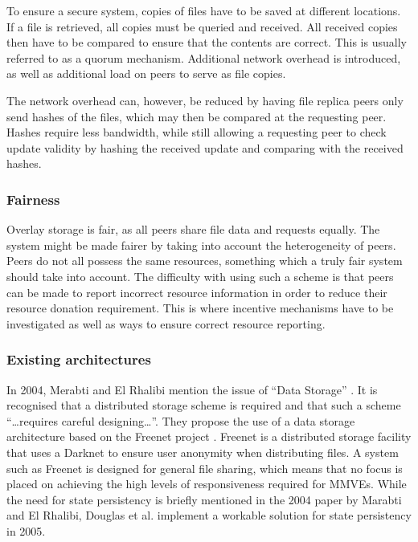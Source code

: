 To ensure a secure system, copies of files have to be saved at different locations. If a file is retrieved, all copies must be queried and received. All received copies then have to be compared to ensure that the contents are correct. This is usually referred to as a quorum mechanism.  Additional network overhead is introduced, as well as additional load on peers to serve as file copies.

The network overhead can, however, be reduced by having file replica peers only send hashes of the files, which may then be compared at the requesting peer. Hashes require less bandwidth, while still allowing a requesting peer to check update validity by hashing the received update and comparing with the received hashes.

\subsubsection{Fairness}

Overlay storage is fair, as all peers share file data and requests equally. The system might be made fairer by taking into account the heterogeneity of peers. Peers do not all possess the same resources, something which a truly fair system should take into account. The difficulty with using such a scheme is that peers can be made to report incorrect resource information in order to reduce their resource donation requirement. This is where incentive mechanisms have to be investigated as well as ways to ensure correct resource reporting.

\subsubsection{Existing architectures}

In 2004, Merabti and El Rhalibi mention the issue of ``Data Storage'' \cite{using_freenet_storage}. It is recognised that a distributed storage scheme is required and that such a scheme ``\ldots requires careful designing\ldots''. They propose the use of a data storage architecture based on the Freenet project \cite{clarke_freenet}. Freenet is a distributed storage facility that uses a Darknet to ensure user anonymity when distributing files. A system such as Freenet is designed for general file sharing, which means that no focus is placed on achieving the high levels of responsiveness required for MMVEs. While the need for state persistency is briefly mentioned in the 2004 paper by Marabti and El Rhalibi, Douglas et
al. implement a workable solution for state persistency in 2005.

